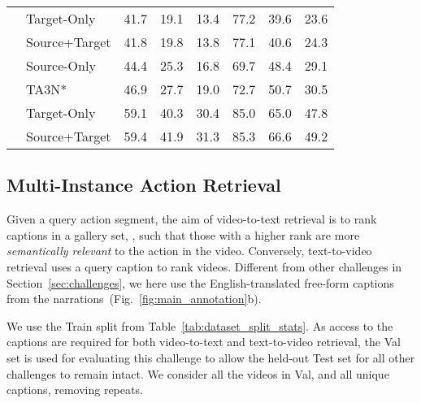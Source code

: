 \documentclass[twocolumn]{svjour3}          \smartqed
\newcommand{\chParagraph}[1]{\noindent {\textbf{#1.}} \hspace{6pt}}
\begin{document}
\begin{table}
\begin{center}
{\begin{tabular}{llrrrrrr}
         & Target-Only &  41.7 &  19.1 &  13.4 &  77.2 &  39.6 &  23.6 \\
          & Source+Target &  41.8 &  19.8 &  13.8 &  77.1 &  40.6 &  24.3 \\
          \midrule
         & Source-Only & 44.4 & 25.3 & 16.8 & 69.7 & 48.4 & 29.1 \\
         & TA3N*~\cite{Chen2019} & 46.9 & 27.7 & 19.0 & 72.7 & 50.7 & 30.5\\
         &  Target-Only &  59.1 &  40.3 &  30.4 &  85.0 &  65.0 &  47.8\\
         &  Source+Target &  59.4 &  41.9 &  31.3 &  85.3 &  66.6 &  49.2\\
    \bottomrule
    \end{tabular}}
    \end{center}
    
\end{table}

\subsection{Multi-Instance Action Retrieval}
\label{sec:action_retrieval_challenge}

\chParagraph{Definition}
\label{subsec:act_retr_definition}
Given a query action segment, the aim of video-to-text retrieval is to rank captions in a gallery set, , such that those with a higher rank are more \emph{semantically relevant} to the action in the video. 
Conversely, text-to-video retrieval uses a query caption  to rank videos. 
Different from other challenges in Section~\ref{sec:challenges}, we here use the English-translated free-form captions from the narrations~(Fig.~\ref{fig:main_annotation}b). 

\chParagraph{Splits}We use the Train split from Table~\ref{tab:dataset_split_stats}. As access to the captions are required for both video-to-text and text-to-video retrieval, the Val set is used for evaluating this challenge to allow the held-out Test set for all other challenges to remain intact. We consider all the videos in Val, and all unique captions, removing repeats.
\end{document}
